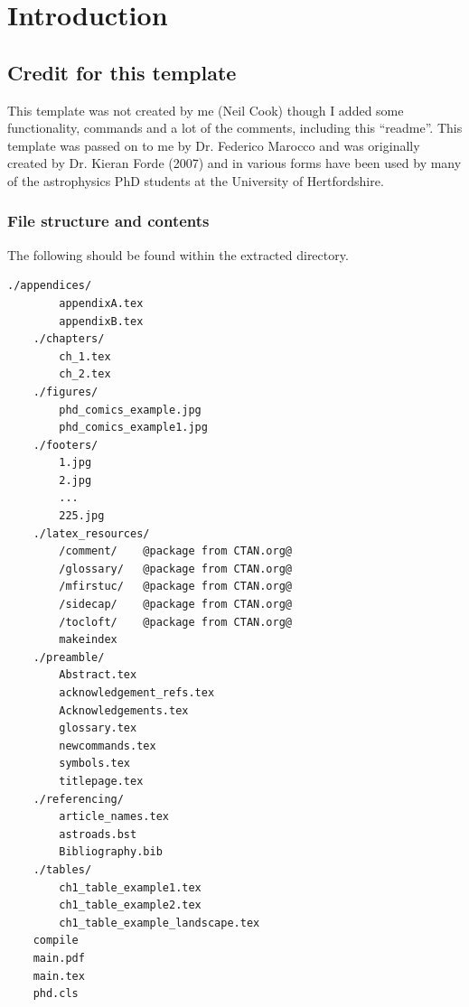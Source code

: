 \clearpage
\chapter{Introduction}
\label{ch1_introduction}
\normalsize




\section{Credit for this template}
    \label{ch1_section_installation}



This template was not created by me (Neil Cook) though I added some functionality, commands and a lot of the comments, including this ``readme''. This template was passed on to me by Dr. Federico Marocco and was originally created by Dr. Kieran Forde (2007) and in various forms have been used by many of the astrophysics PhD students at the University of Hertfordshire.

\subsection{File structure and contents}
    \label{ch1_section_file_structure}

The following should be found within the extracted directory.

\begin{lstlisting}[style=base]
    ./appendices/
        appendixA.tex       
        appendixB.tex
    ./chapters/
        ch_1.tex
        ch_2.tex
    ./figures/
        phd_comics_example.jpg
        phd_comics_example1.jpg
    ./footers/
        1.jpg
        2.jpg
        ...
        225.jpg
    ./latex_resources/
        /comment/    @package from CTAN.org@
        /glossary/   @package from CTAN.org@
        /mfirstuc/   @package from CTAN.org@
        /sidecap/    @package from CTAN.org@
        /tocloft/    @package from CTAN.org@
        makeindex
    ./preamble/
        Abstract.tex 
        acknowledgement_refs.tex 
        Acknowledgements.tex
        glossary.tex 
        newcommands.tex
        symbols.tex
        titlepage.tex
    ./referencing/
        article_names.tex
        astroads.bst
        Bibliography.bib 
    ./tables/
        ch1_table_example1.tex
        ch1_table_example2.tex
        ch1_table_example_landscape.tex
    compile
    main.pdf
    main.tex
    phd.cls
\end{lstlisting}


